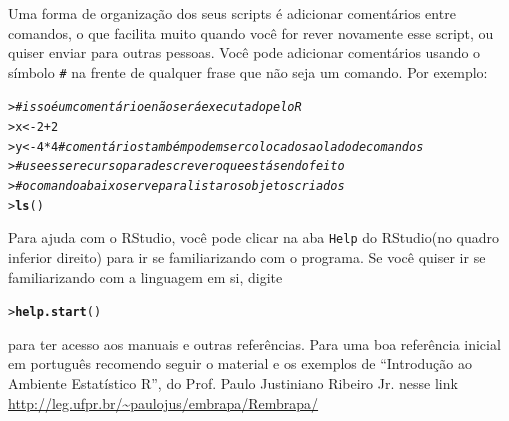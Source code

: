 \documentclass[a4paper,12pt]{article}\usepackage[]{graphicx}\usepackage[]{color}
\makeatletter
\newcommand{\hlnum}[1]{\textcolor[rgb]{0.686,0.059,0.569}{#1}}%
\newcommand{\hlcom}[1]{\textcolor[rgb]{0.678,0.584,0.686}{\textit{#1}}}%
\newcommand{\hlopt}[1]{\textcolor[rgb]{0,0,0}{#1}}%
\newcommand{\hlstd}[1]{\textcolor[rgb]{0.345,0.345,0.345}{#1}}%
\newcommand{\hlkwb}[1]{\textcolor[rgb]{0.69,0.353,0.396}{#1}}%
\newcommand{\hlkwd}[1]{\textcolor[rgb]{0.737,0.353,0.396}{\textbf{#1}}}%
\newenvironment{kframe}{%
 \def\at@end@of@kframe{}%
 \ifinner\ifhmode%
  \def\at@end@of@kframe{\end{minipage}}%
  \begin{minipage}{\columnwidth}%
 \fi\fi%
 \def\FrameCommand##1{\hskip\@totalleftmargin \hskip-\fboxsep
 \colorbox{shadecolor}{##1}\hskip-\fboxsep
     \hskip-\linewidth \hskip-\@totalleftmargin \hskip\columnwidth}%
 \MakeFramed {\advance\hsize-\width
   \@totalleftmargin\z@ \linewidth\hsize
   \@setminipage}}%
 {\par\unskip\endMakeFramed%
 \at@end@of@kframe}
\newenvironment{knitrout}{}{} %
\providecommand{\R}{\textsf{R}\xspace}
\providecommand{\RStudio}{\textsf{RStudio}\xspace}
\makeatother
\begin{document}
Uma forma de organização dos seus scripts é adicionar comentários entre
comandos, o que facilita muito quando você for rever novamente esse
script, ou quiser enviar para outras pessoas. Você pode adicionar
comentários usando o símbolo \texttt{\#} na frente de qualquer frase que
não seja um comando. Por exemplo:

\begin{knitrout}\small
{}\color{fgcolor}\begin{kframe}
\begin{alltt}
\hlstd{> }\hlcom{# isso é um comentário e não será executado pelo R}
\hlstd{> }\hlstd{x} \hlkwb{<-} \hlnum{2} \hlopt{+} \hlnum{2}
\hlstd{> }\hlstd{y} \hlkwb{<-} \hlnum{4} \hlopt{*} \hlnum{4} \hlcom{# comentários também podem ser colocados ao lado de comandos}
\hlstd{> }\hlcom{# use esse recurso para descrever o que está sendo feito}
\hlstd{> }\hlcom{# o comando abaixo serve para listar os objetos criados}
\hlstd{> }\hlkwd{ls}\hlstd{()}
\end{alltt}
\end{kframe}
\end{knitrout}

Para ajuda com o \RStudio, você pode clicar na aba \texttt{Help} do
\RStudio (no quadro inferior direito) para ir se familiarizando com o
programa. Se você quiser ir se familiarizando com a linguagem em si,
digite
\begin{knitrout}\small
{}\color{fgcolor}\begin{kframe}
\begin{alltt}
\hlstd{> }\hlkwd{help.start}\hlstd{()}
\end{alltt}
\end{kframe}
\end{knitrout}
\noindent para ter acesso aos manuais e outras referências. Para uma boa
referência inicial em português recomendo seguir o material e os
exemplos de ``Introdução ao Ambiente Estatístico R'', do Prof. Paulo
Justiniano Ribeiro Jr. nesse link
\url{http://leg.ufpr.br/~paulojus/embrapa/Rembrapa/}


\end{document}
